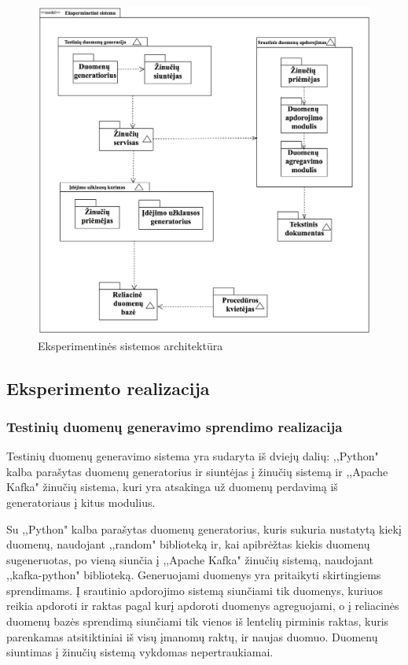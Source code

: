 \documentclass{VUMIFPSkursinis}
\begin{document}
\begin{figure}[!htbp]
    \centering
    \includegraphics[width=1\textwidth]{img/architecture.jpg}
    \caption{Eksperimentinės sistemos architektūra}
    \label{fig:architecture}
\end{figure}
\subsection{Eksperimento realizacija}


\subsubsection{Testinių duomenų generavimo sprendimo realizacija}

Testinių duomenų generavimo sistema yra sudaryta iš dviejų dalių: ,,Python" kalba parašytas duomenų generatorius ir siuntėjas į žinučių sistemą ir
,,Apache Kafka" žinučių sistema, kuri yra atsakinga už duomenų perdavimą iš generatoriaus į kitus modulius.\par
Su ,,Python" kalba parašytas duomenų generatorius, kuris sukuria nustatytą kiekį duomenų, naudojant ,,random" biblioteką ir, kai apibrėžtas kiekis duomenų sugeneruotas,
 po vieną siunčia į ,,Apache Kafka" žinučių sistemą, naudojant ,,kafka-python" biblioteką. Generuojami duomenys yra pritaikyti skirtingiems sprendimams.
Į srautinio apdorojimo sistemą siunčiami tik duomenys, kuriuos reikia apdoroti ir raktas pagal kurį apdoroti duomenys agreguojami, o į reliacinės duomenų
bazės sprendimą siunčiami tik vienos iš lentelių pirminis raktas, kuris parenkamas atsitiktiniai iš visų įmanomų raktų, ir naujas duomuo. Duomenų siuntimas į 
žinučių sistemą vykdomas nepertraukiamai.  \par
\end{document}
